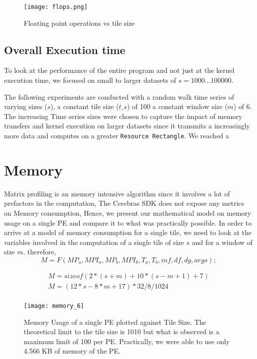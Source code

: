 \begin{figure}[h!]
    \texttt{[image: flops.png]}
    \centering
    \caption{Floating point operations vs tile size}
\end{figure}

\subsection{Overall Execution time}

To look at the performance of the entire program and not just at the kernel execution time, we focused on small to larger datasets of $s = 1000 \dots 100000$.

The following experiments are conducted with a random walk time series of varying sizes ($s$), a constant tile size ($t\_s$) of 100 a constant window size ($m$) of 6.
The increasing Time series sizes were chosen to capture the impact of memory transfers and kernel execution on larger datasets since it transmits a increasingly more data and computes on a greater \texttt{Resource Rectangle}. We reached a 

    
\section{Memory}

Matrix profiling is an memory intensive algorithm since it involves a lot of prefactors in the computation, The Cerebras SDK does not expose any metrics on Memory consumption, Hence, we present our mathematical model on memory usage on a single PE and compare it to what was practically possible. In order to arrive at a model of memory consumption for a single tile, we need to look at the variables involved in the computation of a single tile of size $s$ and for a window of size $m$. therefore,
\begin{equation}
    M = F\left(MP_a, MPI_a, MP_b, MPI_b,T_a, T_b, inf, df, dg, args\right);
\end{equation}

\[
\begin{array}{c}
    M = sizeof(2 * (s + m) + 10 * (s - m + 1) + 7)\\
    M = (12 * s - 8 * m + 17) * 32 / 8 / 1024\\
\end{array}
\]

\begin{figure}[h!]
    \texttt{[image: memory\_6]}
    \centering
    \caption{Memory Usage of a single PE plotted against Tile Size. The theoretical limit to the tile size is 1010 but what is observed is a maximum limit of 100 per PE. Practically, we were able to use only 4.566 KB of memory of the PE.}
\end{figure}

